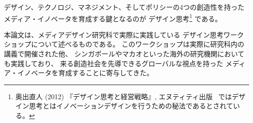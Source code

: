 デザイン、テクノロジ、マネジメント、そしてポリシーの4つの創造性を持った%
メディア・イノベータを育成する鍵となるのが%
デザイン思考\footnote{奥出直人 (2012) 『デザイン思考と経営戦略』,
  エヌティティ出版~\cite{Okude2012}
ではデザイン思考とはイノベーションデザインを行うための秘法であるとされている。}
である。

本論文は、メディアデザイン研究科で実際に実践している%
デザイン思考ワークショップについて述べるものである。
このワークショップは実際に研究科内の講義で開催された他、
シンガポールやマカオといった海外の研究機関においても実践しており、
来る創造社会を先導できるグローバルな視点を持った%
メディア・イノベータを育成することに寄与してきた。

\putendnotes


